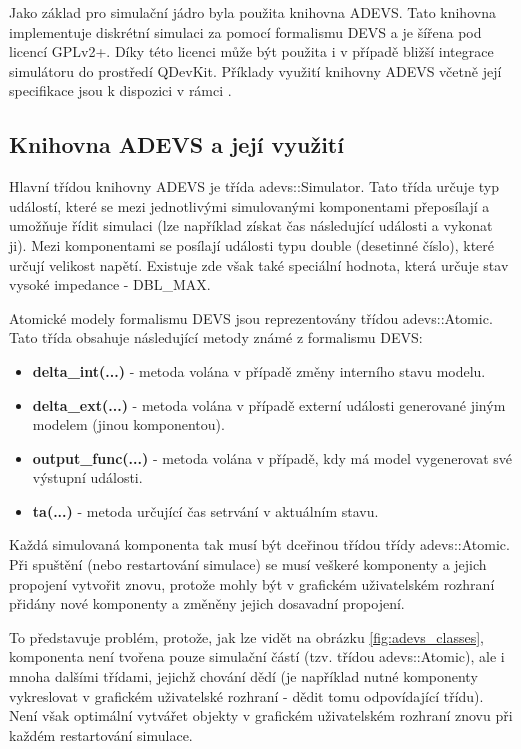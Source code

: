 Jako základ pro simulační jádro byla použita knihovna ADEVS. Tato knihovna implementuje diskrétní simulaci za pomocí formalismu DEVS a je šířena pod licencí GPLv2+. Díky této licenci může být použita i v případě bližší integrace simulátoru do prostředí QDevKit. Příklady využití knihovny ADEVS včetně její specifikace jsou k dispozici v rámci \cite{nutaro}.

\subsection{Knihovna ADEVS a její využití}

Hlavní třídou knihovny ADEVS je třída adevs::Simulator. Tato třída určuje typ událostí, které se mezi jednotlivými simulovanými komponentami přeposílají a umožňuje řídit simulaci (lze například získat čas následující události a vykonat ji). Mezi komponentami se posílají události typu double (desetinné číslo),  které určují velikost napětí. Existuje zde však také speciální hodnota, která určuje stav vysoké impedance - DBL\_MAX.

Atomické modely formalismu DEVS jsou reprezentovány třídou adevs::Atomic. Tato třída obsahuje následující metody známé z formalismu DEVS:

\begin{itemize}
\item \textbf{delta\_int(...)} - metoda volána v případě změny interního stavu modelu.
\item \textbf{delta\_ext(...)} - metoda volána v případě externí události generované jiným modelem (jinou komponentou).
\item \textbf{output\_func(...)} - metoda volána v případě, kdy má model vygenerovat své výstupní události.
\item \textbf{ta(...)} - metoda určující čas setrvání v aktuálním stavu.
\end{itemize}

Každá simulovaná komponenta tak musí být dceřinou třídou třídy adevs::Atomic. Při spuštění (nebo restartování simulace) se musí veškeré komponenty a jejich propojení vytvořit znovu, protože mohly být v grafickém uživatelském rozhraní přidány nové komponenty a změněny jejich dosavadní propojení.

To představuje problém, protože, jak lze vidět na obrázku \ref{fig:adevs_classes}, komponenta není tvořena pouze simulační částí (tzv. třídou adevs::Atomic), ale i mnoha dalšími třídami, jejichž chování dědí (je například nutné komponenty vykreslovat v grafickém uživatelské rozhraní - dědit tomu odpovídající třídu). Není však optimální vytvářet objekty v grafickém uživatelském rozhraní znovu při každém restartování simulace.

